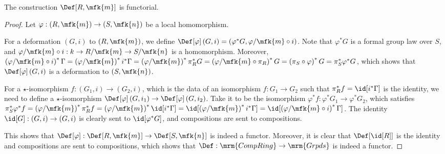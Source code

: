 \begin{proposition}[/definition]
	The construction $\Def[R, \mfk{m}]$ is functorial.
\end{proposition}

\begin{proof}
	Let $\varphi: \left(R, \mfk{m}\right) \to \left(S, \mfk{n}\right)$ be a local homomorphism.
	
	For a deformation $\left(G, i\right)$ to $\left(R, \mfk{m}\right)$, we define
	$
	\Def[\varphi]\left(G, i\right)
	= \left(\varphi^* G, \varphi/\mfk{m} \circ i\right)
	$.
	Note that $\varphi^* G$ is a formal group law over $S$, and $\varphi/\mfk{m} \circ i: k \to R/\mfk{m} \to S/\mfk{n}$ is a homomorphism.
	Moreover,
	$
	\left(\varphi/\mfk{m} \circ i\right)^* \Gamma
	= \left(\varphi/\mfk{m}\right)^* i^* \Gamma
	= \left(\varphi/\mfk{m}\right)^* \pi_R^* G
	= \left(\varphi/\mfk{m} \circ \pi_R\right)^* G
	= \left(\pi_S \circ \varphi\right)^* G
	= \pi_S^* \varphi^* G
	$,
	which shows that $\Def[\varphi]\left(G, i\right)$ is a deformation to $\left(S, \mfk{n}\right)$.
	
	For a $\star$-isomorphism $f: \left(G_1, i\right) \to \left(G_2, i\right)$, which is the data of an isomorphism $f: G_1 \to G_2$ such that $\pi_R^* f = \id[i^*\Gamma]$ is the identity, we need to define a $\star$-isomorphism $\Def[\varphi]\left(G, i_1\right) \to \Def[\varphi]\left(G, i_2\right)$.
	Take it to be the isomorphism $\varphi^* f: \varphi^* G_1 \to \varphi^* G_2$, which satisfies
	$
	\pi_S^* \varphi^* f
	= \left(\varphi/\mfk{m}\right)^* \pi_R^* f
	= \left(\varphi/\mfk{m}\right)^* \id[i^*\Gamma]
	= \id[\left(\varphi/\mfk{m}\right)^* i^*\Gamma]
	= \id[\left(\varphi/\mfk{m} \circ i \right)^*\Gamma]
	$.
	The identity $\id[G]: \left(G, i\right) \to \left(G, i\right)$ is clearly sent to $\id[\varphi^* G]$, and compositions are sent to compositions.
	
	This shows that $\Def[\varphi]: \Def[R, \mfk{m}] \to \Def[S, \mfk{n}]$ is indeed a functor.
	Moreover, it is clear that $\Def[{\id[R]}]$ is the identity and compositions are sent to compositions, which shows that $\Def: \mrm{CompRing} \to \mrm{Grpds}$ is indeed a functor.
\end{proof}
